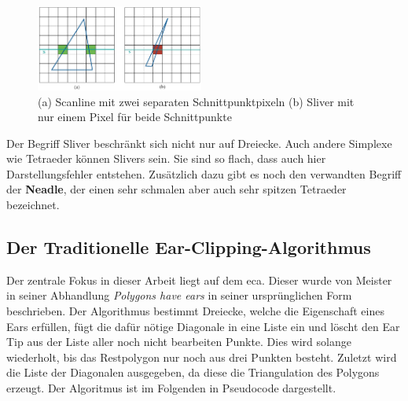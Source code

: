 \begin{figure}
  \centering
  \includegraphics[width=0.49\textwidth]{bilder/sliverScanline.png}
  \caption[Unterschied Sliver und normales Dreieck]{\centering (a) Scanline mit zwei separaten Schnittpunktpixeln (b) Sliver mit nur einem Pixel für beide Schnittpunkte}
  \label{fig:sliver}
\end{figure}

Der Begriff Sliver beschränkt sich nicht nur auf Dreiecke. Auch andere Simplexe wie Tetraeder können Slivers sein. Sie sind so flach, dass auch hier Darstellungsfehler entstehen.
Zusätzlich dazu gibt es noch den verwandten Begriff der \textbf{Neadle}, der einen sehr schmalen aber auch sehr spitzen Tetraeder bezeichnet.\cite{sliver} \linebreak

\subsection{Der Traditionelle Ear-Clipping-Algorithmus}

Der zentrale Fokus in dieser Arbeit liegt auf dem \ac{eca}. Dieser wurde von Meister in seiner Abhandlung \emph{Polygons have ears} \cite{meister} in seiner ursprünglichen Form beschrieben.
Der Algorithmus bestimmt Dreiecke, welche die Eigenschaft eines Ears erfüllen, fügt die dafür nötige Diagonale in eine Liste ein und löscht den Ear Tip aus der Liste aller noch nicht 
bearbeiten Punkte. Dies wird solange wiederholt, bis das Restpolygon nur noch aus drei Punkten besteht. Zuletzt wird die Liste der Diagonalen ausgegeben, da diese die Triangulation des Polygons erzeugt.
Der Algoritmus ist im Folgenden in Pseudocode dargestellt.

